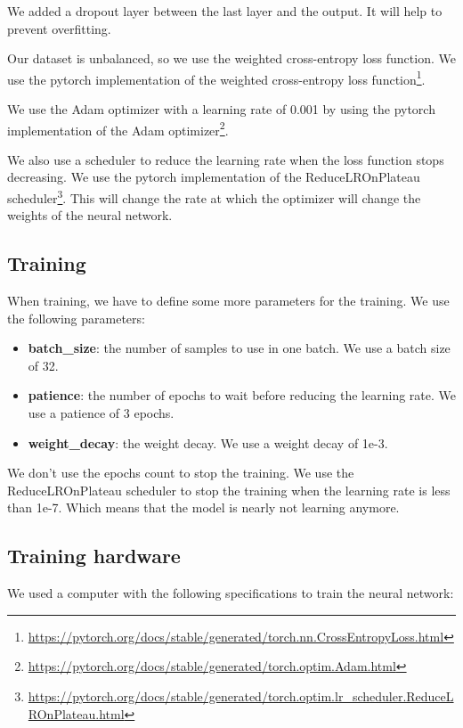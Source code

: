 We added a dropout layer between the last layer and the output. It will help to prevent overfitting. 

Our dataset is unbalanced, so we use the weighted cross-entropy loss function. We use the pytorch implementation of the weighted cross-entropy loss function\footnote{\url{https://pytorch.org/docs/stable/generated/torch.nn.CrossEntropyLoss.html}}.

We use the Adam optimizer with a learning rate of 0.001 by using the pytorch implementation of the Adam optimizer\footnote{\url{https://pytorch.org/docs/stable/generated/torch.optim.Adam.html}}.

We also use a scheduler to reduce the learning rate when the loss function stops decreasing. We use the pytorch implementation of the ReduceLROnPlateau scheduler\footnote{\url{https://pytorch.org/docs/stable/generated/torch.optim.lr_scheduler.ReduceLROnPlateau.html}}. This will change the rate at which the optimizer will change the weights of the neural network.

\subsection{Training}
\label{sec:training}

When training, we have to define some more parameters for the training. We use the following parameters:

\begin{itemize}
    \item \textbf{batch\_size}: the number of samples to use in one batch. We use a batch size of 32.
    \item \textbf{patience}: the number of epochs to wait before reducing the learning rate. We use a patience of 3 epochs.
    \item \textbf{weight\_decay}: the weight decay. We use a weight decay of 1e-3.
\end{itemize}

We don't use the epochs count to stop the training. We use the ReduceLROnPlateau scheduler to stop the training when the learning rate is less than 1e-7. Which means that the model is nearly not learning anymore.

\subsection{Training hardware}
We used a computer with the following specifications to train the neural network:

